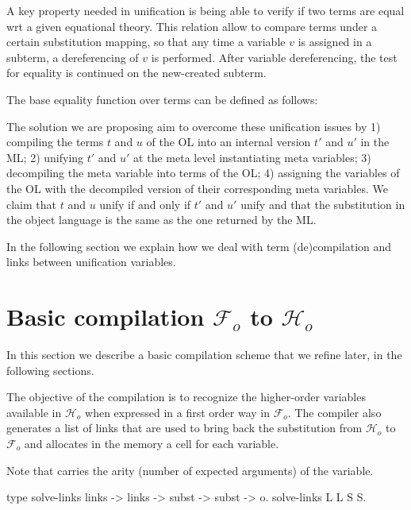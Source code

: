 \documentclass[sigconf,natbib=false,review]{acmart}
\newcommand{\Fo}{\ensuremath{\mathcal{F}_{\!o}\xspace}} %
\newcommand{\Ho}{\ensuremath{\mathcal{H}_o}\xspace}
\begin{document}
\old

A key property needed in unification is being able to verify if two terms are
equal wrt a given equational theory. This relation allow to compare terms under
a certain substitution mapping, so that any time a variable $v$ is assigned in a
subterm, a dereferencing of $v$ is performed. After variable dereferencing, the
test for equality is continued on the new-created subterm.

The base equality function over terms can be defined as follows:

The solution we are proposing aim to overcome these unification issues by 1)
compiling the terms $t$ and $u$ of the OL into an internal version $t'$ and $u'$
in the ML; 2) unifying $t'$ and $u'$ at the meta level instantiating meta
variables; 3) decompiling the meta variable into terms of the OL; 4) assigning
the variables of the OL with the decompiled version of their corresponding meta
variables. We claim that $t$ and $u$ unify if and only if $t'$ and $u'$ unify
and that the substitution in the object language is the same as the one returned
by the ML.  

In the following section we explain how we deal with term (de)compilation and
links between unification variables.

\section[Compilation: fo\_tm to tm]{Basic compilation \Fo{} to \Ho{}}
\label{sec:compilation}

In this section we describe a basic compilation scheme that we refine
later, in the following sections.

The objective of the compilation is to recognize the higher-order variables
available in \Ho{} when expressed in a first order way in \Fo{}. The compiler
also generates a list of links that are used to bring back the substitution from
\Ho{} to \Fo{} and allocates in the memory a cell for each variable.




\noindent
Note that  carries the arity (number of expected arguments) of
the variable. 

\begin{elpicode}
type solve-links links -> links -> subst -> subst -> o.
solve-links L L S S.
\end{elpicode}
\end{document}
